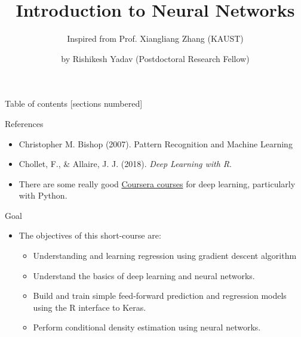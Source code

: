 \documentclass[10pt, hyperref={colorlinks = true,linkcolor = blue}]{beamer}
\title{Introduction to Neural Networks}
\subtitle{Inspired from Prof. Xiangliang Zhang (KAUST) }
\date{}
\author{by Rishikesh Yadav (Postdoctoral Research Fellow)}
\institute{HEC Montr\'eal, McGill University, Canada}
\begin{document}
\maketitle

\begin{frame}{Table of contents}
  [sections numbered]
  \tableofcontents%
\end{frame}



\begin{frame}[fragile]{References}
        \begin{itemize}
        \item Christopher M. Bishop (2007).
Pattern Recognition and Machine Learning
            \item Chollet, F., \& Allaire, J. J. (2018). \emph{Deep Learning with R}.
            \item There are some really good \href{https://www.coursera.org/}{Coursera courses} for deep learning, particularly with Python.
        \end{itemize}
\end{frame}

\begin{frame}{Goal}
\begin{itemize}
    \item The objectives of this short-course are:
    \begin{itemize}
    \item Understanding and learning regression using gradient descent algorithm 
        \item Understand the basics of deep learning and neural networks.
        \item Build and train simple feed-forward prediction and regression models using the R interface to Keras.
        \item Perform conditional density estimation using neural networks.
    \end{itemize}
\end{itemize}

\end{frame}
\end{document}
